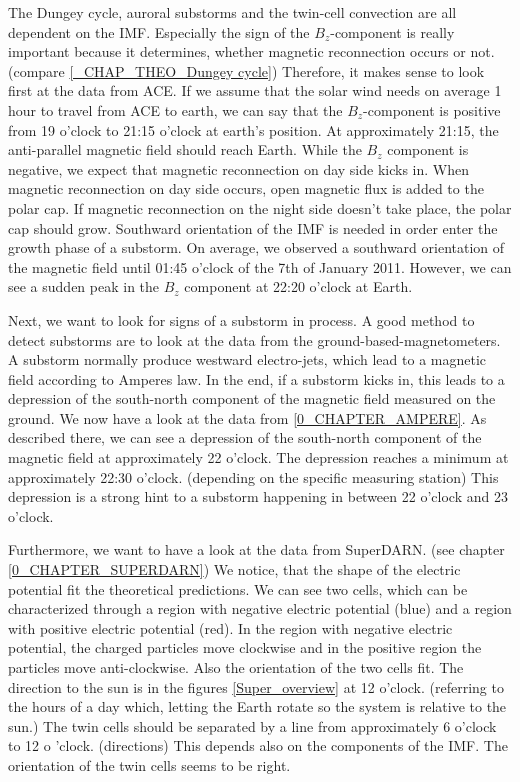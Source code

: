 \documentclass[10pt,a4paper]{article}
\begin{document}
The Dungey cycle, auroral substorms and the twin-cell convection are all dependent on the IMF. Especially the sign of the $B_z$-component is really important because it 
determines, whether magnetic reconnection occurs or not. (compare \ref{_CHAP_THEO_Dungey cycle}) Therefore, it makes sense to look first at the data from ACE. 
If we assume that the solar wind needs on average 1 hour to travel from ACE to earth, we can say that the $B_z$-component is positive from 19 o'clock to 21:15 o'clock 
at earth's position. At approximately 21:15, the anti-parallel magnetic field should reach Earth. While the $B_z$ component is negative, we expect that magnetic 
reconnection on day side kicks in. When magnetic reconnection on day side occurs, open magnetic flux is added to the polar cap. If magnetic reconnection on the night side 
doesn't take place, the polar cap should grow. Southward orientation of the IMF is needed in order enter the growth phase of a substorm. On average, we observed a 
southward orientation of the magnetic field until 01:45 o'clock of the 7th of January 2011. However, we can see a sudden peak in the $B_z$ component at 22:20 o'clock at 
Earth. 

Next, we want to look for signs of a substorm in process. A good method to detect substorms are to look at the data from the ground-based-magnetometers. A substorm 
normally produce westward electro-jets, which lead to a magnetic field according to Amperes law. In the end, if a substorm kicks in, this leads to a depression of the 
south-north component of the magnetic field measured on the ground. We now have a look at the data from \ref{0_CHAPTER_AMPERE}. As described there, we can see a depression
of the south-north component of the magnetic field at approximately 22 o'clock. The depression reaches a minimum at approximately 22:30 o'clock. (depending on the specific 
measuring station) This depression is a strong hint to a substorm happening in between 22 o'clock and 23 o'clock. 

Furthermore, we want to have a look at the data from SuperDARN. (see chapter \ref{0_CHAPTER_SUPERDARN}) We notice, that the shape of the electric potential fit the 
theoretical predictions. We can see two cells, which can be characterized through a region with negative electric potential (blue) and a region with positive electric 
potential (red). In the region with negative electric potential, the charged particles move clockwise and in the positive region the particles move anti-clockwise. 
Also the orientation of the two cells fit. The direction to the sun is in the figures \ref{Super_overview} at 12 o'clock. 
(referring to the hours of a day which, letting the Earth rotate so the system is relative to the sun.) The twin cells should be separated by a line from approximately 
6 o'clock to 12 o 'clock. (directions) This depends also on the components of the IMF. The orientation of the twin cells seems to be right.  
\end{document}

